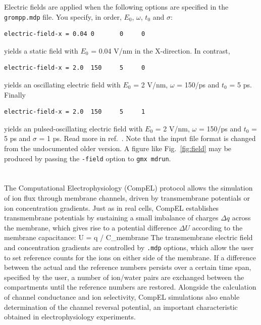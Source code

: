 Electric fields are applied when the following options are specified
in the {\tt grompp.mdp} file. You specify, in order, $E_0$, $\omega$,
$t_0$ and $\sigma$:
\begin{verbatim}
electric-field-x = 0.04 0       0     0
\end{verbatim}
yields a static field with $E_0$ = 0.04 V/nm in the X-direction. In contrast,
\begin{verbatim}
electric-field-x = 2.0  150     5     0
\end{verbatim}
yields an oscillating electric field with $E_0$ = 2 V/nm, $\omega$ = 150/ps and
$t_0$ = 5 ps. Finally 
\begin{verbatim}
electric-field-x = 2.0  150     5     1
\end{verbatim}
yields an pulsed-oscillating electric field with $E_0$ = 2 V/nm, $\omega$ = 150/ps and
$t_0$ = 5 ps and $\sigma$ = 1 ps. Read more in ref.~\cite{Caleman2008a}.
Note that the input file format is changed from the undocumented older
version. A figure like Fig.~\ref{fig:field} may be produced by passing
the {\tt -field} option to {\tt gmx mdrun}.


\section{}
\label{sec:compel}

The Computational Electrophysiology (CompEL) protocol \cite{Kutzner2011b} allows the simulation of
ion flux through membrane channels, driven by transmembrane potentials or ion
concentration gradients. Just as in real cells, CompEL establishes transmembrane
potentials by sustaining a small imbalance of charges $\Delta q$ across the membrane,
which gives rise to a potential difference $\Delta U$ according to the membrane capacitance:
\beq
\Delta U = \Delta q / C_{membrane}
\eeq
The transmembrane electric field and concentration gradients are controlled by
{\tt .mdp} options, which allow the user to set reference counts for the ions on either side
of the membrane. If a difference between the actual and the reference numbers persists
over a certain time span, specified by the user, a number of ion/water pairs are
exchanged between the compartments until the reference numbers are restored.
Alongside the calculation of channel conductance and ion selectivity, CompEL simulations also
enable determination of the channel reversal potential, an important
characteristic obtained in electrophysiology experiments.

